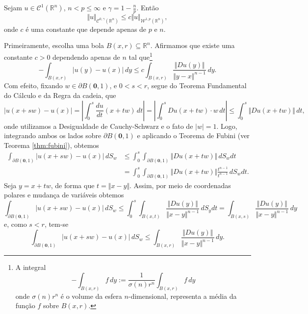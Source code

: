 \documentclass[a4paper, 11pt]{book}
\theoremstyle{definition}
\newcommand{\bR}{\mathbb{R}}
\newcommand{\bz}{\mathbf{0}}
\newcommand{\cC}{\mathcal{C}}
\newcommand{\cW}{\mathcal{W}}
\newcommand{\sint}{-\!\!\!\!\!\!\int}
\begin{document}
\begin{tbox} \label{thm:holdersobolev1}
    Sejam $u \in \cC^1(\bR^n)$, $n < p \leqslant \infty$ e $\gamma = 1 - \frac{n}{p}$. Então
    \[
        \Vert u \Vert_{\cC^{0,\gamma}(\bR^n)} \leqslant c \Vert u \Vert_{\cW^{1,p}(\bR^n)},
    \]
    onde $c$ é uma constante que depende apenas de $p$ e $n$.
\end{tbox}
\begin{prf}
    Primeiramente, escolha uma bola $B(x,r) \subseteq \bR^n$.
    Afirmamos que existe uma constante $c > 0$ dependendo apenas de $n$ tal que\footnote{A integral
    \[
        \sint_{B(x,r)} f\,dy := \frac{1}{\sigma(n)r^n}\int_{B(x,r)} f \,dy
    \]
    onde $\sigma(n)r^n$ é o volume da esfera $n$-dimensional, representa a média da função $f$ sobre $B(x,r)$.}
    \begin{equation} \label{eq:desigualdade-uyux}
        \sint_{B(x,r)} |u(y) - u(x)| \,dy \leqslant c \int_{B(x,r)} \frac{\Vert Du(y) \Vert}{\Vert y - x \Vert^{n-1}} \,dy.
    \end{equation}
    Com efeito, fixando $w \in \partial B(\bz,1)$, e $0 < s < r$, segue do Teorema Fundamental do Cálculo e da Regra da cadeia, que
    \[
        |u(x + sw) - u(x)| = \left| \int_0^s \frac{du}{dt} (x + tw) \,dt \right| = \left|\int_0^s Du(x + tw) \cdot w \,dt \right| \leqslant \int_0^s \Vert Du(x + tw) \Vert \,dt,
    \]
    onde utilizamos a Desigualdade de Cauchy-Schwarz e o fato de $|w| = 1$. Logo, integrando ambos os lados sobre $\partial B(\bz,1)$ e aplicando o Teorema de Fubini (ver Teorema \ref{thm:fubini}), obtemos
    \[
        \begin{aligned}
            \int_{\partial B(\bz,1)} |u(x + sw) - u(x)|\,dS_w &\leqslant  \int_0^s \int_{\partial B(\bz,1)} \Vert Du(x + tw) \Vert \,dS_wdt\\ 
            &= \int_0^s \int_{\partial B(\bz,1)} \Vert Du(x + tw) \Vert \frac{t^{n-1}}{t^{n-1}} \,dS_wdt.
        \end{aligned}
    \]
    Seja $y = x + tw$, de forma que $t = \Vert x - y \Vert$. Assim, por meio de coordenadas polares e mudança de variáveis obtemos
    \[
        \int_{\partial B(\bz,1)} |u(x + sw) - u(x)|\,dS_w \leqslant \int_0^s \int_{B(x,t)} \frac{\Vert Du(y) \Vert}{\Vert x - y \Vert^{n-1}} \,dS_ydt =  \int_{B(x,s)} \frac{\Vert Du(y) \Vert}{\Vert x - y \Vert^{n-1}} \,dy
    \]
    e, como $s < r$, tem-se
    \[
        \int_{\partial B(\bz,1)} |u(x + sw) - u(x)|\,dS_w \leqslant   \int_{B(x,r)} \frac{\Vert Du(y) \Vert}{\Vert x - y \Vert^{n-1}} \,dy.
\]
\end{prf}
\end{document}
